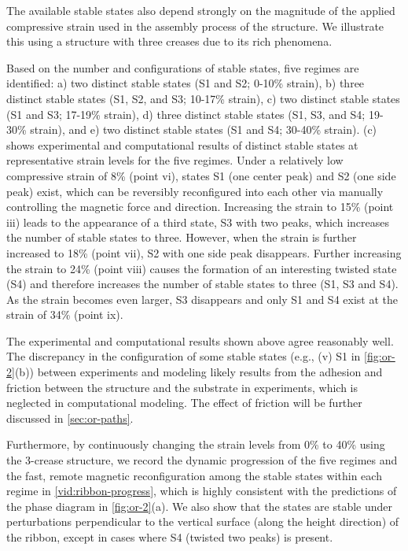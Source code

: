 The available stable states also depend strongly on the magnitude of the applied compressive strain used in the assembly process of the structure.
We illustrate this using a structure with three creases due to its rich phenomena.

Based on the number and configurations of stable states, five regimes are identified: a) two distinct stable states (S1 and S2; 0-10\% strain), b) three distinct stable states (S1, S2, and S3; 10-17\% strain), c) two distinct stable states (S1 and S3; 17-19\% strain), d) three distinct stable states (S1, S3, and S4; 19-30\% strain), and e) two distinct stable states (S1 and S4; 30-40\% strain).
(c) shows experimental and computational results of distinct stable states at representative strain levels for the five regimes.
Under a relatively low compressive strain of 8\% (point vi), states S1 (one center peak) and S2 (one side peak) exist, which can be reversibly reconfigured into each other via manually controlling the magnetic force and direction.
Increasing the strain to 15\% (point iii) leads to the appearance of a third state, S3 with two peaks, which increases the number of stable states to three.
However, when the strain is further increased to 18\% (point vii), S2 with one side peak disappears.
Further increasing the strain to 24\% (point viii) causes the formation of an interesting twisted state (S4) and therefore increases the number of stable states to three (S1, S3 and S4).
As the strain becomes even larger, S3 disappears and only S1 and S4 exist at the strain of 34\% (point ix).

The experimental and computational results shown above agree reasonably well.
The discrepancy in the configuration of some stable states (e.g., (v) S1 in \cref{fig:or-2}(b)) between experiments and modeling likely results from the adhesion and friction between the structure and the substrate in experiments, which is neglected in computational modeling.
The effect of friction will be further discussed in \cref{sec:or-paths}.

Furthermore, by continuously changing the strain levels from 0\% to 40\% using the 3-crease structure, we record the dynamic progression of the five regimes and the fast, remote magnetic reconfiguration among the stable states within each regime in \cref{vid:ribbon-progress}, which is highly consistent with the predictions of the phase diagram in \cref{fig:or-2}(a).
We also show that the states are stable under perturbations perpendicular to the vertical surface (along the height direction) of the ribbon, except in cases where S4 (twisted two peaks) is present.

